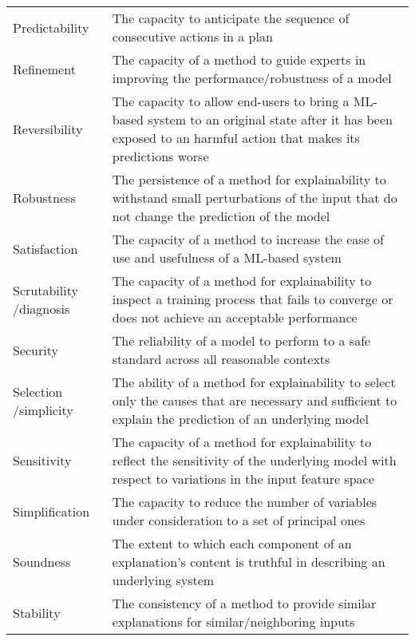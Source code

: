 \documentclass[final,1p,times]{elsarticle}
\begin{document}
\begin{table}[htbp]
\begin{tabular}{m{1.7cm} m{10.9cm}}
    Predictability & The capacity to anticipate the sequence of consecutive actions in a plan \cite{zhang2017plan}\\
    Refinement & The capacity of a method to guide experts in improving the performance/robustness of a model \cite{liu2017towards}\\
    Reversibility & The capacity to allow end-users to bring a ML-based system to an original state after it has been exposed to an harmful action that makes its predictions worse \cite{kulesza2015principles,kulesza2013too}\\
    Robustness & The persistence of a method for explainability to withstand small perturbations of the input that do not change the prediction of the model \cite{alvarez2018robustness, liu2017towards}\\
    Satisfaction & The capacity of a method  to increase the ease of use and usefulness of a ML-based system \cite{tintarev2011designing, tintarev2007survey, tintarev2015explaining}\\
    Scrutability /\newline diagnosis & The capacity of a method for explainability to inspect a training process that fails to converge or does not achieve an acceptable performance \cite{liu2017towards, tintarev2011designing, tintarev2007survey}\\
    Security &  The reliability of a model to perform to a safe standard across all reasonable contexts \cite{mcallister2017concrete}\\
    Selection /\newline simplicity & The ability of a method for explainability to select only the causes that are necessary and sufficient to explain the prediction of an underlying model \cite{miller2017explainable}\\
    Sensitivity & The capacity of a method for explainability to reflect the sensitivity of the underlying model with respect to variations in the input feature space \cite{kindermans2017reliability, sundararajan2017axiomatic}\\
    Simplification & The capacity to reduce the number of variables under consideration to a set of principal ones \cite{offert2017know}\\
    Soundness & The extent to which each component of an explanation's content is truthful in describing an underlying system \cite{kulesza2015principles,kulesza2013too}\\
    Stability & The consistency of a method to provide similar explanations for similar/neighboring inputs \cite{melis2018towards}\\

\end{tabular}
\end{table}
\end{document}
